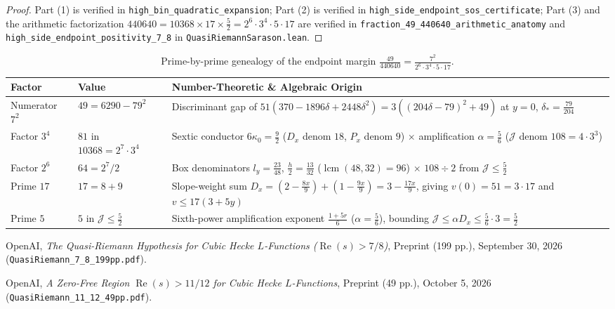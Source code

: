 \documentclass[11pt]{amsart}
\theoremstyle{definition}
\theoremstyle{remark}
\begin{document}
\begin{proof}
Part (1) is verified in \texttt{high\_bin\_quadratic\_expansion}; Part (2) is verified in \allowbreak\texttt{high\_side\_endpoint\_sos\_certificate}; Part (3) and the arithmetic factorization $440640 = 10368 \times 17 \times \frac{5}{2} = 2^6 \cdot 3^4 \cdot 5 \cdot 17$ are verified in \texttt{fraction\_49\_440640\_arithmetic\_anatomy} and \texttt{high\_side\_endpoint\_positivity\_7\_8} in \texttt{QuasiRiemannSarason.lean}.
\end{proof}

\begin{table}[ht]
\centering
\caption{Prime-by-prime genealogy of the endpoint margin $\frac{49}{440640} = \frac{7^2}{2^6 \cdot 3^4 \cdot 5 \cdot 17}$.}
\label{tab:anatomy}
\small
\begin{tabular}{@{}llp{8.8cm}@{}}
\toprule
\textbf{Factor} & \textbf{Value} & \textbf{Number-Theoretic \& Algebraic Origin} \\
\midrule
Numerator $7^2$ & $49 = 6290 - 79^2$ & Discriminant gap of $51(370 - 1896\delta + 2448\delta^2) = 3((204\delta - 79)^2 + 49)$ at $y=0$, $\delta_* = \frac{79}{204}$ \\
\addlinespace[3pt]
Factor $3^4$ & $81$ in $10368 = 2^7 \cdot 3^4$ & Sextic conductor $6\kappa_0 = \frac{9}{2}$ ($D_x$ denom $18$, $P_x$ denom $9$) $\times$ amplification $\alpha = \frac{5}{6}$ ($\mathcal{J}$ denom $108 = 4 \cdot 3^3$) \\
\addlinespace[3pt]
Factor $2^6$ & $64 = 2^7 / 2$ & Box denominators $l_y = \frac{23}{48}$, $\frac{h}{2} = \frac{13}{32}$ ($\operatorname{lcm}(48,32)=96$) $\times$ $108 \div 2$ from $\mathcal{J} \le \frac{5}{2}$ \\
\addlinespace[3pt]
Prime $17$ & $17 = 8 + 9$ & Slope-weight sum $D_x = (2 - \frac{8x}{9}) + (1 - \frac{9x}{9}) = 3 - \frac{17x}{9}$, giving $v(0) = 51 = 3 \cdot 17$ and $v \le 17(3+5y)$ \\
\addlinespace[3pt]
Prime $5$ & $5$ in $\mathcal{J} \le \frac{5}{2}$ & Sixth-power amplification exponent $\frac{1+5r}{6}$ ($\alpha = \frac{5}{6}$), bounding $\mathcal{J} \le \alpha D_x \le \frac{5}{6} \cdot 3 = \frac{5}{2}$ \\
\bottomrule
\end{tabular}
\end{table}

\begin{thebibliography}{9}
OpenAI, \emph{The Quasi-Riemann Hypothesis for Cubic Hecke $L$-Functions ($\operatorname{Re}(s) > 7/8$)}, Preprint (199 pp.), September 30, 2026 (\texttt{QuasiRiemann\_7\_8\_199pp.pdf}).

OpenAI, \emph{A Zero-Free Region $\operatorname{Re}(s) > 11/12$ for Cubic Hecke $L$-Functions}, Preprint (49 pp.), October 5, 2026 (\texttt{QuasiRiemann\_11\_12\_49pp.pdf}).
\end{thebibliography}
\end{document}
